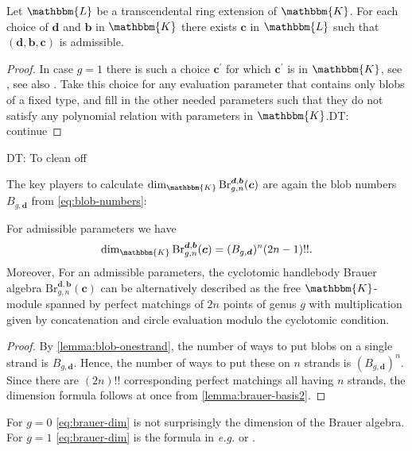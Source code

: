 \documentclass[a4paper,11pt]{amsart}
\newcommand{\eg}{\textsl{e.g.}}
\newcommand{\setstuff}[1]{\mathrm{#1}}
\newcommand{\KK}{\mathbbm{K}}
\newcommand{\KKL}{\mathbbm{L}}
\newcommand{\bsym}[1]{\boldsymbol{#1}}
\newcommand{\cpar}{\bsym{c}}
\newcommand{\bpar}{\bsym{b}}
\newcommand{\dpar}{\bsym{d}}
\def\DT#1{\textcolor[rgb]{1.00,0.00,1.00}{DT: #1}}
\numberwithin{equation}{section}
\let\fullref\autoref
\begin{document}
\begin{lemma}\label{lemma:handlebody-blobbmw-second}
Let $\KKL$ be a transcendental ring extension of $\KK$.
For each choice of $\dpar$ and $\bpar$ in $\KK$ there exists $\cpar$
in $\KKL$
such that $(\dpar,\bpar,\cpar)$ is admissible.
\end{lemma}

\begin{proof}
In case $g=1$ there is such a choice $\cpar^{\prime}$ 
for which $\cpar^{\prime}$ is in $\KK$, see 
\cite[Theorem 3.2]{GoHaMo-cyclotomic-bmw2}, see also
\cite{WiYu-cyclotomic-bmw}.
Take this choice for any evaluation parameter that contains 
only blobs of a fixed type, and fill in the other 
needed parameters such that they do not satisfy any 
polynomial relation with parameters in $\KK$.\DT{continue}
\end{proof}

\DT{To clean off}

The key players to calculate 
$\dim_{\KK}\setstuff{Br}_{g,n}^{\dpar,\bpar}(\cpar)$
are again the blob numbers $B_{g,\dpar}$
from \eqref{eq:blob-numbers}:

\begin{proposition}\label{proposition:brauer-dim}
For admissible parameters we have 
\begin{gather}\label{eq:brauer-dim}
\dim_{\KK}\setstuff{Br}_{g,n}^{\dpar,\bpar}(\cpar)
=
(B_{g,\dpar})^{n}(2n-1)!!.
\end{gather}
Moreover, For an admissible parameters, the cyclotomic handlebody 
Brauer algebra $\setstuff{Br}_{g,n}^{\dpar,\bpar}(\cpar)$ can be alternatively 
described as the free $\KK$-module spanned by 
perfect matchings of $2n$ points of genus $g$ with multiplication 
given by concatenation and circle evaluation modulo the cyclotomic 
condition. 
\end{proposition}

\begin{proof}
By \fullref{lemma:blob-onestrand}, the number of ways to put blobs 
on a single strand is $B_{g,\dpar}$. Hence, 
the number of ways to put these on $n$ strands is 
$(B_{g,\dpar})^{n}$. Since there are $(2n)!!$ corresponding 
perfect matchings all having $n$ strands, 
the dimension formula follows at once from \fullref{lemma:brauer-basis2}.
\end{proof}

\begin{example}
For $g=0$ \eqref{eq:brauer-dim} is not surprisingly the dimension 
of the Brauer algebra. For $g=1$ \eqref{eq:brauer-dim} 
is the formula in {\eg} \cite[Section 11]{HaOl-cyclotomic-bmw} or
\cite[Theorem 4.11]{Yu-cyclotomic-bmw}.
\end{example}
\end{document}

